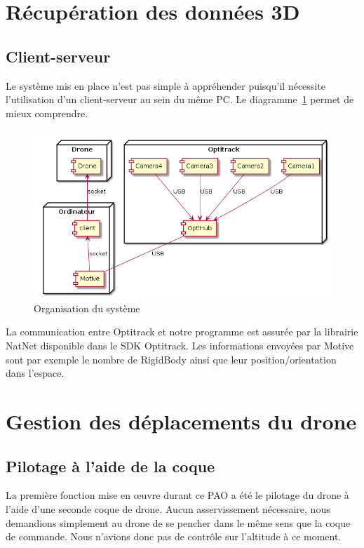     \section{Récupération des données 3D}

        \subsection{Client-serveur}
            Le système mis en place n'est pas simple à appréhender puisqu'il nécessite l'utilisation d'un client-serveur au sein du même PC\@. Le diagramme~\ref{fig_organisation_systeme} permet de mieux comprendre.

            \begin{figure}[h]
                \includegraphics[width=13cm]{images/diagramme_Composant.png}
                \caption{Organisation du système}
                \label{fig_organisation_systeme}
            \end{figure}

            La communication entre Optitrack et notre programme est assurée par la librairie NatNet disponible dans le SDK Optitrack. Les informations envoyées par Motive sont par exemple le nombre de RigidBody ainsi que leur position/orientation dans l'espace.


    \section{Gestion des déplacements du drone}

        \subsection{Pilotage à l'aide de la coque}
           La première fonction mise en œuvre durant ce PAO a été le pilotage du drone à l'aide d'une seconde coque de drone. Aucun asservissement nécessaire, nous demandions simplement au drone de se pencher dans le même sens que la coque de commande. Nous n'avions donc pas de contrôle sur l'altitude à ce moment. \\

